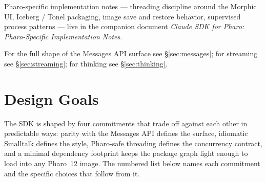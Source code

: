 \documentclass[a4paper,10pt,fleqn]{article}
\begin{document}
Pharo-specific implementation notes --- threading discipline around
the Morphic UI, Iceberg / Tonel packaging, image save and restore
behavior, supervised process patterns --- live in the companion
document \emph{Claude SDK for Pharo: Pharo-Specific
Implementation Notes}.

For the full shape of the Messages API surface see
\S\ref{sec:messages}; for streaming see \S\ref{sec:streaming}; for
thinking see \S\ref{sec:thinking}.

\medskip
{}

\section{Design Goals}
\label{sec:design-goals}

The SDK is shaped by four commitments that trade off against each
other in predictable ways: parity with the Messages API defines the
surface, idiomatic Smalltalk defines the style, Pharo-safe threading
defines the concurrency contract, and a minimal dependency footprint
keeps the package graph light enough to load into any Pharo~12 image.
The numbered list below names each commitment and the specific choices
that follow from it.
\end{document}
